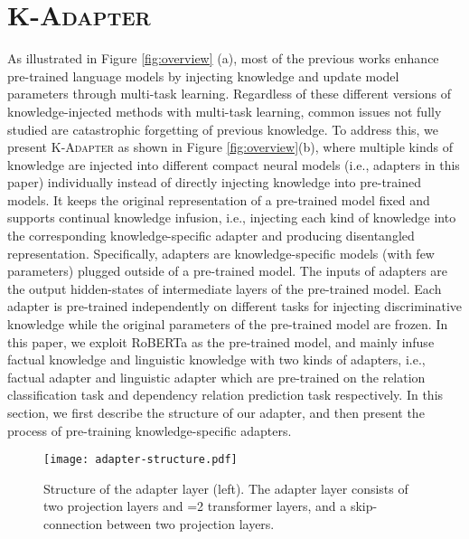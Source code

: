\documentclass[11pt,a4paper]{article}
\begin{document}
\section{\textsc{K-Adapter}}
As illustrated in Figure \ref{fig:overview} (a), most of the previous works enhance pre-trained language models by injecting knowledge and update model parameters through multi-task learning. Regardless of these different versions of knowledge-injected methods with multi-task learning, common issues not fully studied are catastrophic forgetting of previous knowledge. To address this, we present \textsc{K-Adapter} as shown in Figure \ref{fig:overview}(b), where multiple kinds of knowledge are injected into different compact neural models (i.e., adapters in this paper) individually instead of directly injecting knowledge into pre-trained models. It keeps the original representation of a pre-trained model fixed and supports continual knowledge infusion, i.e., injecting each kind of knowledge into the corresponding knowledge-specific adapter and producing disentangled representation. Specifically, adapters are knowledge-specific models (with few parameters) plugged outside of a pre-trained model. The inputs of adapters are the output hidden-states of intermediate layers of the pre-trained model. Each adapter is pre-trained independently on different tasks for injecting discriminative knowledge while the original parameters of the pre-trained model are frozen. In this paper, we exploit RoBERTa \citep{liu2019roberta} as the pre-trained model, and mainly infuse factual knowledge and linguistic knowledge with two kinds of adapters, i.e., factual adapter and linguistic adapter which are pre-trained on the relation classification task and dependency relation prediction task respectively. In this section, we first describe the structure of our adapter, and then present the process of pre-training knowledge-specific adapters.

\begin{figure}[t!]
    \centering
    \texttt{[image: adapter-structure.pdf]}
\caption{Structure of the adapter layer (left). The adapter layer consists of two projection layers and =2 transformer layers, and a skip-connection between two projection layers.}
    \label{fig:adapter-stru}
    \vspace{-3mm}
\end{figure}
\end{document}
